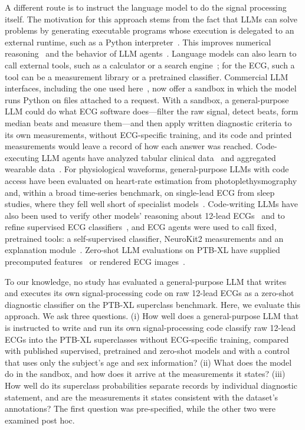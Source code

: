 A different route is to instruct the language model to do the signal processing itself. The motivation for this approach stems
from the fact that LLMs can solve problems by generating executable programs whose execution is delegated to an external
runtime, such as a Python interpreter~\citep{gao2023pal}. This improves numerical reasoning~\citep{chen2023pot} and the
behavior of LLM agents~\citep{wang2024codeact}. Language models can also learn to call external
tools, such as a calculator or a search engine~\citep{schick2023toolformer}; for the ECG, such a tool can be a
measurement library or a pretrained classifier. Commercial LLM interfaces, including the one used
here~\citep{anthropic2026codeexec}, now offer a sandbox in which the model runs Python on files attached to a request.
With a sandbox, a general-purpose LLM could do what ECG software does---filter the raw signal, detect beats, form median
beats and measure them---and then apply written diagnostic criteria to its own measurements, without ECG-specific
training, and its code and printed measurements would leave a record of how each answer was reached. Code-executing LLM
agents have analyzed tabular clinical data~\citep{tayebiarasteh2024automl} and aggregated wearable
data~\citep{merrill2026phia,heydari2025pha}. For physiological waveforms, general-purpose LLMs with code access have
been evaluated on heart-rate estimation from photoplethysmography~\citep{feli2025ppgagent} and, within a broad
time-series benchmark, on single-lead ECG from sleep studies, where they fell well short of specialist
models~\citep{li2026hearts}. Code-writing LLMs have also been used to verify other models' reasoning about 12-lead
ECGs~\citep{xu2026ecgreasoning} and to refine supervised ECG classifiers~\citep{deng2026recursiveecg}, and ECG agents
were used to call fixed, pretrained tools: a self-supervised classifier, NeuroKit2 measurements and an explanation
module~\citep{chung2026ecgagent}. Zero-shot LLM evaluations on PTB-XL have supplied
precomputed features~\citep{yu2023zeroshot,yu2025alfred} or rendered ECG
images~\citep{liu2024teach,seki2025assessing,gao2026luminaecg}.

To our knowledge, no study has evaluated a
general-purpose LLM that writes and executes its own signal-processing code on raw 12-lead ECGs as a zero-shot
diagnostic classifier on the PTB-XL superclass benchmark. Here, we evaluate this approach. We ask three questions. (i) How well does a general-purpose LLM that is instructed to write and run
its own signal-processing code classify raw 12-lead ECGs into the PTB-XL superclasses without ECG-specific training,
compared with published supervised, pretrained and zero-shot models and with a control that uses only the subject's age and sex information?
(ii) What does the model do in the sandbox, and how does it arrive at the measurements it states? (iii) How well do its
superclass probabilities separate records by individual diagnostic statement, and are the measurements it states
consistent with the dataset's annotations? The first question was pre-specified, while the other two were examined post hoc.

